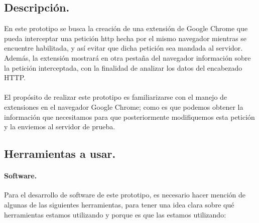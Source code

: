 \documentclass[12pt, a4paper, titlepage]{report}
\begin{document}
			\subsection{Descripción.}
				En este prototipo se busca la creación de una extensión de Google Chrome que pueda interceptar una petición \acrshort{http} hecha por el mismo navegador mientras se encuentre habilitada, y así evitar que dicha petición sea mandada al servidor. Además, la extensión mostrará en otra pestaña del navegador información sobre la petición interceptada, con la finalidad de analizar los datos del encabezado HTTP. \\\\
				El propósito de realizar este prototipo es familiarizarse con el manejo de extensiones en el navegador Google Chrome; como es que podemos obtener la información que necesitamos para que posteriormente modifiquemos esta petición y la enviemos al servidor de prueba. 
			
			\subsection{Herramientas a usar.}
				\paragraph{Software. \\}
				Para el desarrollo de software de este prototipo, es necesario hacer mención de algunas de las siguientes herramientas, para tener una idea clara sobre qué herramientas estamos utilizando y porque es que las estamos utilizando:
				
\end{document}
